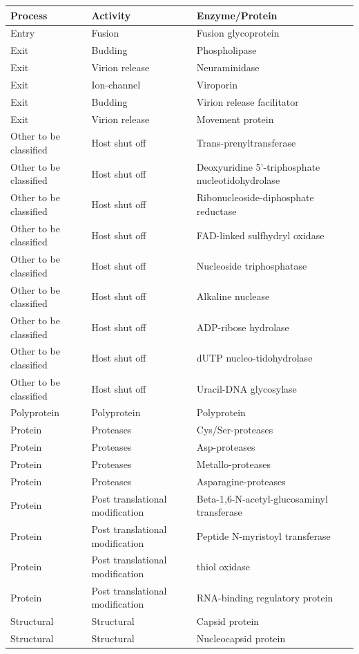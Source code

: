 \documentclass[
  sn-nature,
]{sn-jnl}
\begin{document}
\begin{longtable}{lll}
\toprule
Process & Activity & Enzyme/Protein\\
\midrule
Entry & Fusion & Fusion glycoprotein\\
Exit & Budding & Phospholipase\\
Exit & Virion release & Neuraminidase\\
Exit & Ion-channel & Viroporin\\
Exit & Budding & Virion release facilitator\\
Exit & Virion release & Movement protein\\
Other to be classified & Host shut off & Trans-prenyltransferase\\
Other to be classified & Host shut off & Deoxyuridine 5'-triphosphate nucleotidohydrolase\\
Other to be classified & Host shut off & Ribonucleoside-diphosphate reductase\\
Other to be classified & Host shut off & FAD-linked sulfhydryl oxidase\\
Other to be classified & Host shut off & Nucleoside triphosphatase\\
Other to be classified & Host shut off & Alkaline nuclease\\
Other to be classified & Host shut off & ADP-ribose hydrolase\\
Other to be classified & Host shut off & dUTP nucleo-tidohydrolase\\
Other to be classified & Host shut off & Uracil-DNA glycosylase\\
Polyprotein & Polyprotein & Polyprotein\\
Protein & Proteases & Cys/Ser-proteases\\
Protein & Proteases & Asp-proteases\\
Protein & Proteases & Metallo-proteases\\
Protein & Proteases & Asparagine-proteases\\
Protein & Post translational modification & Beta-1,6-N-acetyl-glucosaminyl transferase\\
Protein & Post translational modification & Peptide N-myristoyl transferase\\
Protein & Post translational modification & thiol oxidase\\
Protein & Post translational modification & RNA-binding regulatory protein\\
Structural & Structural & Capsid protein\\
Structural & Structural & Nucleocapsid protein\\

\end{longtable}
\end{document}
